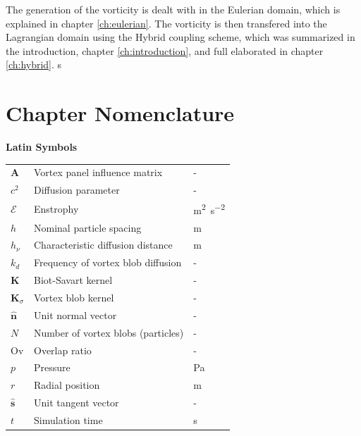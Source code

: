The generation of the vorticity is dealt with in the Eulerian domain, which is explained in chapter \ref{ch:eulerian}. The vorticity is then transfered into the Lagrangian domain using the Hybrid coupling scheme, which was summarized in the introduction, chapter \ref{ch:introduction}, and full elaborated in chapter \ref{ch:hybrid}.
s
\section{Chapter Nomenclature}

{\textbf{\textsf{Latin Symbols}}}

{\renewcommand{\arraystretch}{1.2} %
\begin{longtable}{p{1.5cm}p{10.5cm}p{1.5cm}}
    $\mathbf{A}$			& Vortex panel influence matrix						& -\\         

	$c^2$ 					& Diffusion parameter 								& - \\

    $\mathcal{E}$			& Enstrophy			  								& \si{m^2.s^{-2}} \\

    $h$						& Nominal particle spacing							& \si{m}\\   
    $h_{\nu}$				& Characteristic diffusion distance					& \si{m}\\ 

	$k_d$ & Frequency of vortex blob diffusion  								& -\\
    $\mathbf{K}$			& Biot-Savart kernel 								& -\\ 
    $\mathbf{K}_{\sigma}$	& Vortex blob kernel 								& -\\     

	$\hat{\mathbf{n}}$  	& Unit normal vector 								& -\\
	$N$  					& Number of vortex blobs (particles) 				& -\\

	$\mathrm{Ov}$			& Overlap ratio 									& - \\    
	
	$p$						& Pressure											& \si{Pa}\\

	$r$ 					& Radial position 									& \si{m}\\
	
	$\hat{\mathbf{s}}$		& Unit tangent vector								& - \\
	
	$t$						& Simulation time									& \si{s} \\
	

\end{longtable}}
